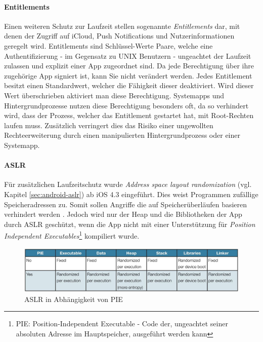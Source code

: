 		\paragraph{Entitlements}
			Einen weiteren Schutz zur Laufzeit stellen sogenannte \textsl{Entitlements}
			dar, mit denen der Zugriff auf iCloud, Push	Notifications und
			Nutzerinformationen geregelt wird. Entitlements sind Schlüssel-Werte Paare,
			welche eine	Authentifizierung - im Gegensatz zu UNIX Benutzern - ungeachtet
			der Laufzeit zulassen und explizit einer App zugeordnet sind. Da jede
			Berechtigung über ihre zugehörige App signiert ist, kann Sie nicht
			verändert werden. Jedes Entitlement besitzt einen Standardwert, welcher die
			Fähigkeit dieser deaktiviert. Wird dieser Wert überschrieben aktiviert man
			diese Berechtigung.	Systemapps und Hintergrundprozesse nutzen diese
			Berechtigung besonders oft, da so verhindert wird, dass der Prozess, welcher
			das Entitlement gestartet hat, mit Root-Rechten laufen muss.
			Zusätzlich verringert dies das Risiko einer ungewollten Rechteerweiterung
			durch einen manipulierten Hintergrundprozess oder einer Systemapp.
		
		\paragraph{ASLR}\label{sec:ios-aslr}
			Für zusätzlichen Laufzeitschutz wurde \textsl{Address space layout
			randomization} \cite[S. 1]{iOS4SecurityEvalutaion} (vgl. Kapitel
			\ref{sec:android-aslr}) ab iOS 4.3 eingeführt.
			Dies weist Programmen zufällige Speicheradressen zu. Somit sollen Angriffe die auf
			Speicherüberläufen basieren verhindert werden \cite[S. 131]{Levin2012}.
			Jedoch wird nur der Heap und die Bibliotheken der App durch
			ASLR geschützt, wenn die App nicht mit einer Unterstützung für
			\textsl{Position Independent Executables}\footnote{PIE: Position-Independent
			Executable - Code der, ungeachtet seiner absoluten Adresse im Hauptspeicher,
			ausgeführt werden kann} kompiliert wurde.
			\begin{figure}[h]
				\centering
				\includegraphics[width=0.9\linewidth]{ios/media/aslr-pie.jpg}
				\caption{ASLR in Abhängigkeit von PIE
				\cite[S. 1]{iOS4SecurityEvalutaion}}
				\label{fig:aslr}
			\end{figure}
		
